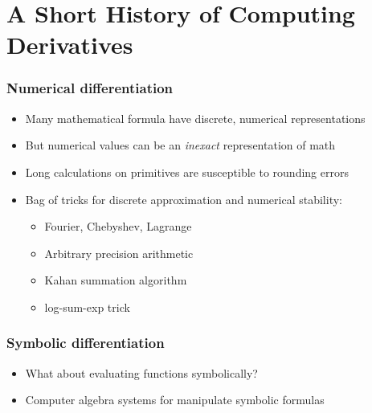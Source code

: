 \documentclass{beamer}
\begin{document}
    \section{A Short History of Computing Derivatives}\label{sec:second-section}


    \begin{frame}
        \frametitle{Numerical differentiation}
        \begin{itemize}
            \item Many mathematical formula have discrete, numerical representations
            \item But numerical values can be an \textit{inexact} representation of math
            \item Long calculations on primitives are susceptible to rounding errors
            \item Bag of tricks for discrete approximation and numerical stability:
            \begin{itemize}
                \item Fourier, Chebyshev, Lagrange
                \item Arbitrary precision arithmetic
                \item Kahan summation algorithm
                \item log-sum-exp trick
            \end{itemize}
        \end{itemize}
    \end{frame}


    \begin{frame}
        \frametitle{Symbolic differentiation}
        \begin{itemize}
            \item What about evaluating functions symbolically?
            \item Computer algebra systems for manipulate symbolic formulas
        \end{itemize}
    \end{frame}

\end{document}

